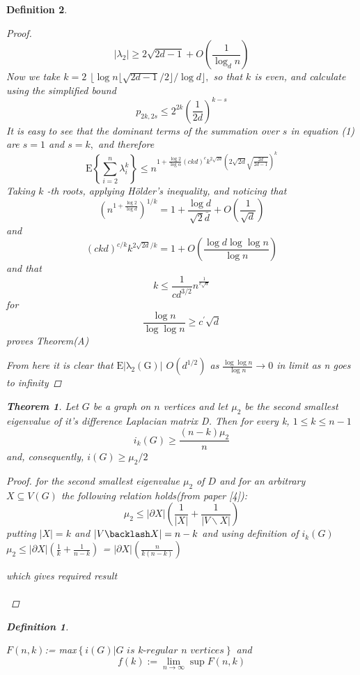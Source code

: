 \documentclass[oneside]{book}
\newtheorem{theorem}{Theorem}[section]
\newtheorem{mydef}{Definition}
\begin{document}
\begin{mydef}
\begin{proof}
$$
\left|\lambda_{2}\right| \geq 2 \sqrt{2 d-1}+O\left(\frac{1}{\log _{d} n}\right)
$$
Now we take $k=2$ $\lfloor\log n\lfloor\sqrt{2 d-1} / 2\rfloor / \log d\rfloor,$ so that $k$ is even, and calculate
using the simplified bound
$$
p_{2 k, 2 s} \leq 2^{2 k}\left(\frac{1}{2 d}\right)^{k-s}
$$
It is easy to see that the dominant terms of the summation over $s$ in equation (1) are $s=1$ and $s=k,$ and therefore
$$
\mathrm{E}\left\{\sum_{i=2}^{n} \lambda_{i}^{k}\right\} \leq n^{1+\frac{\log 2}{\log \alpha}(c k d)^{c} k^{2 \sqrt{2 d}}(2 \sqrt{2 d} \sqrt{\frac{2 d}{2 d-1}})^{k}}
$$
Taking $k$ -th roots, applying Hölder's  inequality, and noticing that
$$
\left(n^{1+\frac{\log 2}{\log d}}\right)^{1 / k}=1+\frac{\log d}{\sqrt{2} \bar{d}}+O\left(\frac{1}{\sqrt{d}}\right)
$$
and 
$$
(c k d)^{c / k} k^{2 \sqrt{2 d} / k}=1+O\left(\frac{\log d \log \log n}{\log n}\right)
$$
and that
$$
k \leq \frac{1}{c d^{3 / 2}} n^{\frac{1}{c \sqrt{a}}}
$$
for
$$
\frac{\log n}{\log \log n} \geq c^{\prime} \sqrt{d}
$$
proves Theorem(A)  \par 
From here it is clear that $\mathrm{E|\lambda_{2}(G)|}$ \leq $O(d^{1/2})$ as $\frac{ \log \log n}{\log n}\rightarrow 0$ in limit  as n goes to  infinity 
\end{proof} 
\begin{theorem} 
\label{t:14}
 Let $G$ be a graph on $n$ vertices and let $\mu_{2}$ be the second smallest eigenvalue of it's difference Laplacian matrix D. Then for every k, 
$1 \leq k \leq n-1$
$$
i_{k}(G) \geq \frac{(n-k) \mu_{2}}{n}
$$
and, consequently, $i(G) \geq \mu_{2} / 2$ \par
\end{theorem} 
\begin{proof}
for the second smallest eigenvalue $\mu_{2}$ of $D$ and for an arbitrary $X \subseteq V(G)$ the following relation holds(from paper [4]):
$$
\mu_{2} \leq|\partial X|\left(\frac{1}{|X|}+\frac{1}{|V \backslash X|}\right)
$$
putting $|X| = k $ and $|V\backlash X| = n-k $ and using definition of $i_k(G)$ 
 $ \mu_{2} \leq|\partial X|\left(\frac{1}{k}+\frac{1}{n-k}\right)$ = $|\partial X|\left(\frac{n}{k(n-k)}\right) $ \par
 which gives required result\\\\
 \end{proof} 
 
 \begin{mydef} \label{d:19}
 
 
$F(n, k)$:= max$\left\{i(G)| \textit{G is k-regular  n vertices} \right\}$ 
and
$$
f(k):=\lim _{n \rightarrow \infty} \sup F(n, k)
$$
\end{mydef}
 

\end{mydef}
\end{document}
